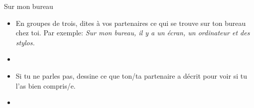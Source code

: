 \begin{frame}{Sur mon bureau }
  \begin{itemize}
    \item En groupes de trois, dites à vos partenaires ce qui se trouve sur ton bureau chez toi.
      Par exemple: \emph{Sur mon bureau, il y a un écran, un ordinateur et des stylos.}
    \item[] 
    \item Si tu ne parles pas, dessine ce que ton/ta partenaire a décrit pour voir si tu l'as bien compris/e.
    \item[] 
  \end{itemize}
\end{frame}